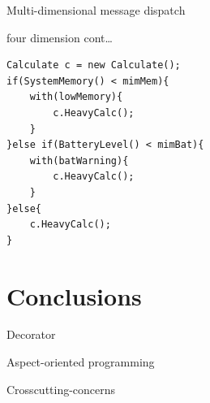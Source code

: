 \documentclass[presentation]{beamer}
\begin{document}
\begin{frame}[fragile,label={sec:org29b52d5}]{Multi-dimensional message dispatch}
 \begin{block}{four dimension  cont\ldots{}}
\begin{verbatim}
Calculate c = new Calculate();
if(SystemMemory() < mimMem){
    with(lowMemory){
        c.HeavyCalc();
    }
}else if(BatteryLevel() < mimBat){
    with(batWarning){
        c.HeavyCalc();
    }
}else{
    c.HeavyCalc();
}
\end{verbatim}
\end{block}
\end{frame}

\section{Conclusions}
\label{sec:orgd775ea3}

\begin{frame}[label={sec:org1913f01}]{Decorator}
\end{frame}
\begin{frame}[label={sec:org3c1ff4d}]{Aspect-oriented programming}
\end{frame}
\begin{frame}[label={sec:org384c212}]{Crosscutting-concerns}
\end{frame}
\end{document}
